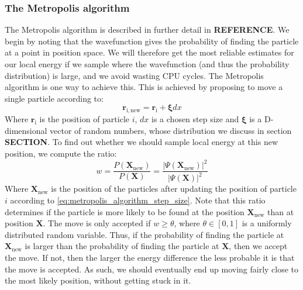 \documentclass[a4paper, 10pt]{article}
\begin{document}
	\subsubsection{The Metropolis algorithm}
	The Metropolis algorithm is described in further detail in \textbf{REFERENCE}. We begin by noting that the wavefunction gives the probability of finding the particle at a point in position space. We will therefore get the most reliable estimates for our local energy if we sample where the wavefunction (and thus the probability distribution) is large, and we avoid wasting CPU cycles. The Metropolis algorithm is one way to achieve this. This is achieved by proposing to move a single particle according to:
	\begin{equation}\label{eq:metropolis_algorithm_step_size}
	\boldsymbol{r}_{\mathrm{i,new}}=\boldsymbol{r}_{\mathrm{i}}+\boldsymbol{\xi}dx
	\end{equation}
	Where $\boldsymbol{r}_{\mathrm{i}}$ is the position of particle $i$, $dx$ is a chosen step size and $\boldsymbol{\xi}$ is a D-dimensional vector of random numbers, whose distribution we discuss in section \textbf{SECTION}. To find out whether we should sample local energy at this new position, we compute the ratio:
	\begin{equation}\label{eq:transition_probability}
	w=\frac{P(\boldsymbol{X}_{\mathrm{new}})}{P(\boldsymbol{X})}=\frac{|\Psi(\boldsymbol{X}_{\mathrm{new}})|^2}{|\Psi(\boldsymbol{X})|^2}
	\end{equation}
	Where $\boldsymbol{X}_{\mathrm{new}}$ is the position of the particles after updating the position of particle $i$ according to \ref{eq:metropolis_algorithm_step_size}. Note that this ratio determines if the particle is more likely to be found at the position $\boldsymbol{X}_{\mathrm{new}}$ than at position $\boldsymbol{X}$. The move is only accepted if $w\geq \theta$, where $\theta\in[0,1]$ is a uniformly distributed random variable. Thus, if the probability of finding the particle at $\mathbf{X}_{\mathrm{new}}$ is larger than the probability of finding the particle at $\mathbf{X}$, then we accept the move. If not, then the larger the energy difference the less probable it is that the move is accepted. As such, we should eventually end up moving fairly close to the most likely position, without getting stuck in it.
\end{document}
